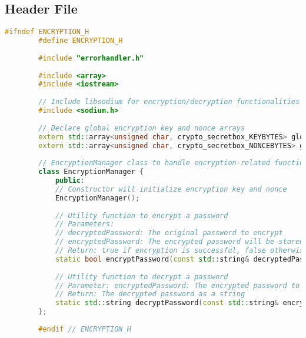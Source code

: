 \documentclass{article}
\begin{document}
	\subsection*{Header File}
	\begin{mdframed}[backgroundcolor=background, hidealllines=false, innerleftmargin=15pt, innerrightmargin=5pt, innertopmargin=0pt, innerbottommargin=-5pt, linecolor=accent]
	\begin{lstlisting}[language=C++]
		#ifndef ENCRYPTION_H
		#define ENCRYPTION_H
		
		#include "errorhandler.h"
		
		#include <array>
		#include <iostream>
		
		// Include libsodium for encryption/decryption functionalities
		#include <sodium.h>
		
		// Declare global encryption key and nonce arrays
		extern std::array<unsigned char, crypto_secretbox_KEYBYTES> globalEncryptionKey;
		extern std::array<unsigned char, crypto_secretbox_NONCEBYTES> globalEncryptionNonce;
		
		// EncryptionManager class to handle encryption-related functionalities
		class EncryptionManager {
			public:
			// Constructor will initialize encryption key and nonce
			EncryptionManager();
			
			// Utility function to encrypt a password
			// Parameters: 
			// decryptedPassword: The original password to encrypt
			// encryptedPassword: The encrypted password will be stored here
			// Return: true if encryption is successful, false otherwise
			static bool encryptPassword(const std::string& decryptedPassword, std::string& encryptedPassword);
			
			// Utility function to decrypt a password
			// Parameter: encryptedPassword: The encrypted password to decrypt
			// Return: The decrypted password as a string
			static std::string decryptPassword(const std::string& encryptedPassword);
		};
		
		#endif // ENCRYPTION_H
	\end{lstlisting}
	\end{mdframed}
	
\end{document}
